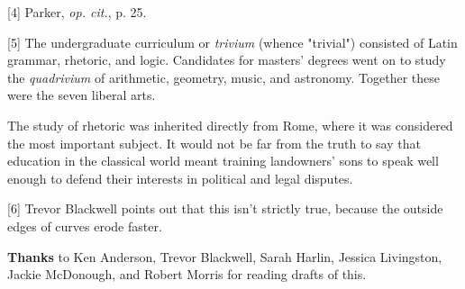[4] Parker, \emph{op. cit.},
                  p. 25.

[5] The undergraduate curriculum or
                  \emph{trivium} (whence "trivial") consisted of Latin grammar,
                  rhetoric, and logic. Candidates for masters' degrees went on
                  to study the \emph{quadrivium} of arithmetic, geometry, music,
                  and astronomy. Together these were the seven liberal arts.

The
                  study of rhetoric was inherited directly from Rome, where it
                  was considered the most important subject. It would not be far
                  from the truth to say that education in the classical world
                  meant training landowners' sons to speak well enough to defend
                  their interests in political and legal disputes.

[6]
                  Trevor Blackwell points out that this isn't strictly true,
                  because the outside edges of curves erode faster.


                  \textbf{Thanks} to Ken Anderson, Trevor Blackwell, Sarah Harlin,
                  Jessica Livingston, Jackie McDonough, and Robert Morris for
                  reading drafts of this.



              
            
          
